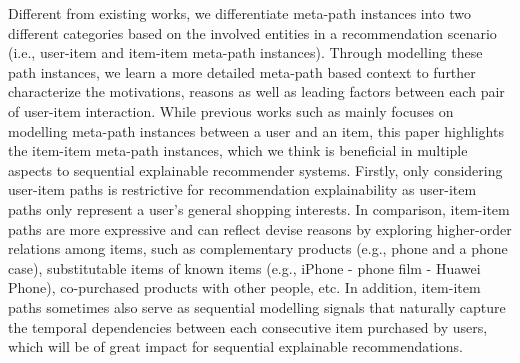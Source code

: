 Different from existing works, we differentiate meta-path instances into two different categories based on the involved entities in a recommendation scenario (i.e., user-item and item-item meta-path instances). Through modelling these path instances, we learn a more detailed meta-path based context to further characterize the motivations, reasons as well as leading factors between each pair of user-item interaction. While previous works such as \cite{hu2018leveraging} mainly focuses on modelling meta-path instances between a user and an item, this paper highlights the item-item meta-path instances, which we think is beneficial in multiple aspects to sequential explainable recommender systems. Firstly, only considering user-item paths is restrictive for recommendation explainability as user-item paths only represent a user's general shopping interests. In comparison, item-item paths are more expressive and can reflect devise reasons by exploring higher-order relations among items, such as complementary products (e.g., phone and a phone case), substitutable items of known items (e.g., iPhone - phone film - Huawei Phone), co-purchased products with other people, etc. In addition, item-item paths sometimes also serve as sequential modelling signals that naturally capture the temporal dependencies between each consecutive item purchased by users, which will be of great impact for sequential explainable recommendations. 



